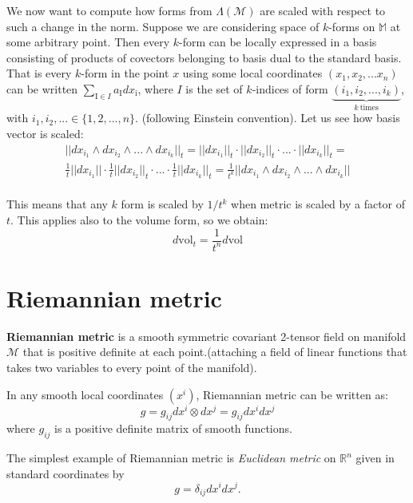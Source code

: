 \documentclass[licencjacka]{pracamgr}
\theoremstyle{definition}
\theoremstyle{definition}
\theoremstyle{plain}
\theoremstyle{plain}
\begin{document}
We now want to compute how forms from $\Lambda(\mathcal{M})$ are scaled
with respect to such a change in the norm. Suppose we are considering
space of $k$-forms on $\mathbb{M}$ at some arbitrary point. Then every
$k$-form can be locally expressed in a basis consisting of products of
covectors belonging to basis dual to the standard basis. That is every
$k$-form in the point $x$ using some local coordinates $(x_1, x_2,
... x_n)$ can be written $ \sum_{\mathrm{I} \in I } a_\mathrm{I}
dx_\mathrm{i}$, where $I$ is the set of $k$-indices of form
$\underbrace{(i_1, i_2, ..., i_k)}_{k~\mathrm{times}}$, with $i_1,
i_2, ... \in \{1, 2, ..., n \}$.  (following Einstein convention).
Let us see how basis vector is scaled:
\begin{multline*}
    ||dx_{i_1} \wedge dx_{i_2} \wedge ... \wedge dx_{i_k} ||_t =  
    ||dx_{i_1} ||_t \cdot ||  dx_{i_2} ||_t \cdot ... \cdot || dx_{i_k} ||_t =  \\
    \frac{1}{t}||dx_{i_1} || \cdot \frac{1}{t} ||  dx_{i_2} ||_t \cdot ...
     \cdot \frac{1}{t} || dx_{i_k} ||_t = 
    \frac{1}{t^k}||dx_{i_1} \wedge dx_{i_2} \wedge ... \wedge dx_{i_k} ||
\end{multline*} \\

This means that any $k$ form is scaled by $1/t^k$ when metric is scaled
by a factor of $t$.
This applies also to the volume form, so we obtain:
\[
d\mathrm{vol}_t = \frac{1}{t^n} d\mathrm{vol}
\]

\section{Riemannian metric}

\textbf{Riemannian metric} is a smooth symmetric covariant 2-tensor field
on manifold $\mathcal{M}$ that is positive definite at each point.(attaching
a field of linear functions that takes two variables to every point of the
manifold).

In any smooth local coordinates
$(x^i)$, Riemannian metric can be written as:
\[
    g = g_{ij} dx^i \otimes dx^j = g_{ij} dx^i dx^j
\]
where $g_{ij}$ is a positive definite matrix of smooth functions. 

The simplest example of Riemannian metric is \emph{Euclidean metric} on
$\mathbb{R}^n$ given in standard coordinates by 
\[
    g = \delta_{ij}dx^idx^j.
\]


\end{document}
